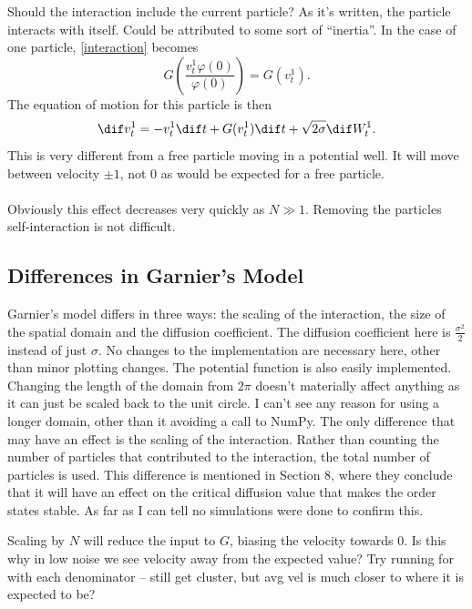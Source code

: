 \documentclass[11pt,a4paper, dvipsnames]{article}
\renewcommand{\phi}{\varphi}
\begin{document}
        \begin{boxnote}
            Should the interaction include the current particle? As it's written, the particle interacts with itself. Could be attributed to some sort of ``inertia''. In the case of one particle, \eqref{interaction} becomes  
            \[ G\left(\frac{v^1_t\phi(0)}{\phi(0)}\right) = G(v^1_t).\]
            The equation of motion for this particle is then 
            \[\dif v^1_t = -v^1_t \dif t + G(v^1_t) \dif t +\sqrt{2\sigma}\dif W^1_t.\]
            This is very different from a free particle moving in a potential well. It will move between velocity $\pm1$, not 0 as would be expected for a free particle. \\
            \\
            Obviously this effect decreases very quickly as $N \gg 1$. Removing the particles self-interaction is not difficult.
        \end{boxnote}
        \subsection{Differences in Garnier's Model}\label{garnierdiff}
            Garnier's model differs in three ways: the scaling of the interaction, the size of the spatial domain and the diffusion coefficient. The diffusion coefficient here is $\frac{\sigma^2}{2}$ instead of just $\sigma$. No changes to the implementation are necessary here, other than minor plotting changes. The potential function is also easily implemented. Changing the length of the domain from $2\pi$ doesn't materially affect anything as it can just be scaled back to the unit circle. I can't see any reason for using a longer domain, other than it avoiding a call to NumPy. The only difference that may have an effect is the scaling of the interaction. Rather than counting the number of particles that contributed to the interaction, the total number of particles is used. This difference is mentioned in Section 8, where they conclude that it will have an effect on the critical diffusion value that makes the order states stable. As far as I can tell no simulations were done to confirm this.
            \begin{boxnote}
                Scaling by $N$ will reduce the input to $G$, biasing the velocity towards 0. Is this why in low noise we see velocity away from the expected value? Try running for with each denominator -- still get cluster, but avg vel is much closer to where it is expected to be?
            \end{boxnote}
            
\end{document}
